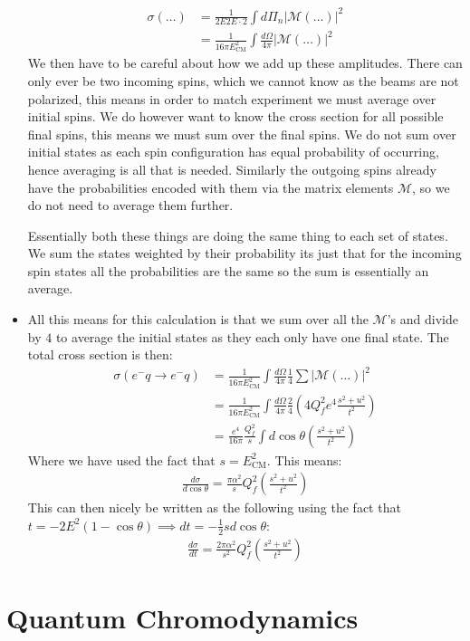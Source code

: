 \documentclass[11pt]{article}
\numberwithin{equation}{section}
\begin{document}
\begin{itemize}
     \begin{align*}
         \sigma(\ldots)  &= \frac{1}{2E2E \cdot 2}\int d\Pi_n|\mathcal{M}(\ldots)|^2\\
          & =\frac{1}{16\pi E_{\text{CM}}^2}\int \frac{d \Omega}{4\pi}|\mathcal{M}(\ldots)|^2
     \end{align*}
     We then have to be careful about how we add up these amplitudes. There can only ever be two incoming spins, which we cannot know as the beams are not polarized, this means in order to match experiment we must average over initial spins. We do however want to know the cross section for all possible final spins, this means we must sum over the final spins. We do not sum over initial states as each spin configuration has equal probability of occurring, hence averaging is all that is needed. Similarly the outgoing spins already have the probabilities encoded with them via the matrix elements $\mathcal{M}$, so we do not need to average them further. 

     Essentially both these things are doing the same thing to each set of states. We sum the states weighted by their probability its just that for the incoming spin states all the probabilities are the same so the sum is essentially an average. 

      \item All this means for this calculation is that we sum over all the $\mathcal{M}$'s and divide by $4$ to average the initial states as they each only have one final state.  The total cross section is then:
      \begin{align*}
          \sigma(e^-q \rightarrow e^-q) &=  \frac{1}{16\pi E_{\text{CM}}^2}\int \frac{d \Omega}{4\pi}\frac{1}{4}\sum|\mathcal{M}(\ldots)|^2 \\
          & =  \frac{1}{16\pi E_{\text{CM}}^2}\int \frac{d \Omega}{4\pi}\frac{2}{4}\left(4Q_f^2e^4\frac{s^2+u^2}{t^2}\right) \\
          & = \frac{e^4}{16\pi}\frac{Q_f^2}{s}\int d \cos \theta \left(\frac{s^2+u^2}{t^2}\right)
      \end{align*}
      Where we have used the fact that $s=E_{\text{CM}}^2$. This means:
      \begin{align*}
           \frac{d\sigma}{d\cos\theta} = \frac{\pi\alpha^2}{s}Q_f^2\left(\frac{s^2+u^2}{t^2}\right)
      \end{align*}
      This can then nicely be written as the following using the fact that $ t= -2E^2(1-\cos \theta)  \implies dt = -\frac{1}{2}sd\cos\theta$:
      \begin{align*}
          \frac{d\sigma}{dt} = \frac{2\pi\alpha^2}{s^2}Q_f^2\left(\frac{s^2+u^2}{t^2}\right)
      \end{align*}
        
\end{itemize}
\newpage 
\section{Quantum Chromodynamics} %
\label{sec:quantum_chromodynamics}

\end{document}
